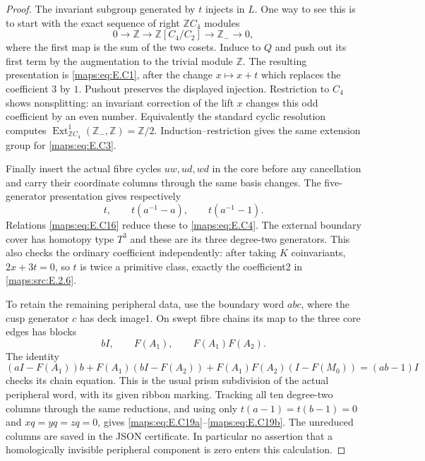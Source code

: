 \begin{proof}
The invariant subgroup generated by $t$ injects in
$L$. One way to see this is to start with the exact
sequence of right $\mathbb ZC_4$ modules
\[
 0\longrightarrow\mathbb Z\longrightarrow
 \mathbb Z[C_4/C_2]\longrightarrow\mathbb Z_-\longrightarrow0,
\]
where the first map is the sum of the two cosets.
Induce to $Q$ and push out its first term by the
augmentation to the trivial module $\mathbb Z$.
The resulting presentation is \eqref{maps:eq:E.C1}, after the
change $x\mapsto x+t$ which replaces the coefficient
$3$ by $1$. Pushout preserves the displayed injection.
Restriction to $C_4$ shows nonsplitting: an invariant
correction of the lift $x$ changes this odd coefficient
by an even number. Equivalently the standard cyclic
resolution computes
$\operatorname{Ext}^1_{\mathbb ZC_4}(\mathbb Z_-,\mathbb Z)
=\mathbb Z/2$. Induction--restriction gives the same
extension group for \eqref{maps:eq:E.C3}.

Finally insert the actual fibre cycles $uw,ud,wd$ in
the core before any cancellation and carry their
coordinate columns through the same basis changes.
The five-generator presentation gives respectively
\[
 t,\qquad t(a^{-1}-a),\qquad t(a^{-1}-1).
 \tag{E.C18}\label{maps:eq:E.C18}
\]
Relations \eqref{maps:eq:E.C16} reduce these to \eqref{maps:eq:E.C4}. The external
boundary cover has homotopy type $T^3$ and these are
its three degree-two generators. This also checks
the ordinary coefficient independently: after taking
$K$ coinvariants, $2x+3t=0$, so $t$ is twice a
primitive class, exactly the coefficient2 in \ref{maps:src:E.2.6}.

To retain the remaining peripheral data, use the
boundary word $abc$, where the cusp generator $c$
has deck image1. On swept fibre chains its map to
the three core edges has blocks
\[
                 bI,\qquad F(A_1),\qquad F(A_1)F(A_2).
 \tag{E.C21}\label{maps:eq:E.C21}
\]
The identity
\[
 (aI-F(A_1))b+F(A_1)(bI-F(A_2))
       +F(A_1)F(A_2)(I-F(M_0))=(ab-1)I
\]
checks its chain equation. This is the usual prism
subdivision of the actual peripheral word, with
its given ribbon marking. Tracking all ten
degree-two columns through the same reductions,
and using only $t(a-1)=t(b-1)=0$ and
$xq=yq=zq=0$, gives \eqref{maps:eq:E.C19a}--\eqref{maps:eq:E.C19b}.
The unreduced columns are saved in the JSON
certificate. In particular no assertion that a
homologically invisible peripheral component is
zero enters this calculation.
\end{proof}


